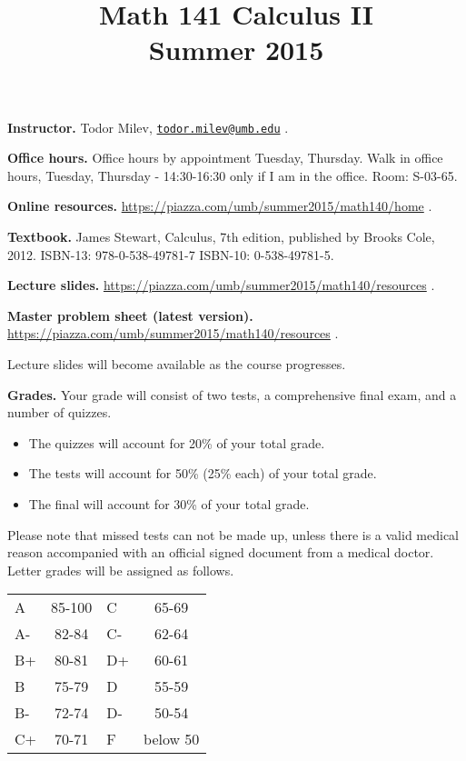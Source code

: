 \documentclass{article}
\title{Math 141 Calculus II \\ Summer 2015}
\date{}
\newcommand{\websitebase}{https://piazza.com/umb/summer2015/math140}
\begin{document}
\maketitle

\noindent \textbf{Instructor.} Todor Milev, \href{mailto:todor.milev@umb.edu}{\nolinkurl{todor.milev@umb.edu}} \quad \quad \quad .

\medskip
\noindent \textbf{Office hours. } Office hours by appointment Tuesday, Thursday. Walk in office hours, Tuesday, Thursday - 14:30-16:30 only if I am in the office. Room: S-03-65.

\medskip
\noindent \textbf{Online resources. }  \url{\websitebase/home}  \quad \quad \quad .


\medskip\noindent \textbf{Textbook. }  James Stewart, Calculus, 7th edition, published by Brooks Cole, 2012. ISBN-13: 978-0-538-49781-7
ISBN-10: 0-538-49781-5.

\medskip \noindent \textbf{Lecture slides. }  \url{\websitebase/resources} \quad \quad \quad .

\medskip \noindent \textbf{Master problem sheet (latest version). }  \url{\websitebase/resources} \quad \quad \quad .


\medskip\noindent Lecture slides will become available as the course progresses.



\medskip
\noindent \textbf{Grades.} Your grade will consist of two tests, a comprehensive final exam, and a number of quizzes. 
\begin{itemize}
\item The quizzes will account for 20\% of your total grade.
\item The tests will account for 50\% (25\% each) of your total grade.
\item The final will account for 30\% of your total grade.
\end{itemize}
Please note that missed tests can not be made up, unless there is a valid medical reason accompanied with an official signed document from a medical doctor. Letter grades will be assigned as follows. 

\begin{center}
\begin{tabular}{lc|lc}
A & 85-100 & C & 65-69 \\
A-& 82-84 & C- & 62-64 \\
B+& 80-81 & D+ & 60-61 \\
B & 75-79& D & 55-59\\
B-& 72-74& D- & 50-54\\
C+& 70-71& F & below 50\\
\end{tabular}

\end{center}
\end{document}
